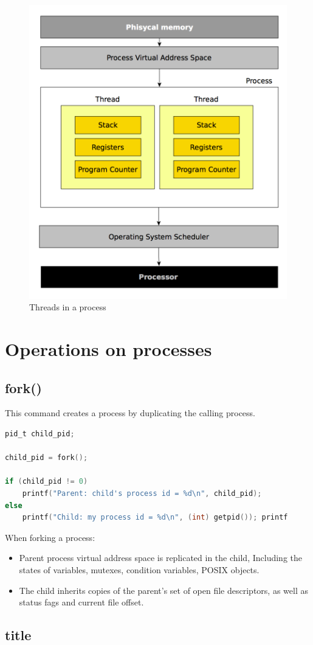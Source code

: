 \begin{figure}[h]
	\centering
	\includegraphics[width=\textwidth]{gfx/process_threads}
	
	\caption{Threads in a process}
	\label{Fig:process_threads}
\end{figure}



\pagebreak
\section{Operations on processes}

\subsection{fork()}
This command creates a process by duplicating the calling process.
\begin{lstlisting}[language=C]
pid_t child_pid; 

child_pid = fork();

if (child_pid != 0)
	printf("Parent: child's process id = %d\n", child_pid);
else
	printf("Child: my process id = %d\n", (int) getpid()); printf
\end{lstlisting}

When forking a process:
\begin{itemize}
	\item Parent process virtual address space is replicated in the child, Including the states of variables, mutexes, condition variables, POSIX objects.
	\item The child inherits copies of the parent's set of open file descriptors, as well as status fags and current file offset.
\end{itemize}

\subsection{title}